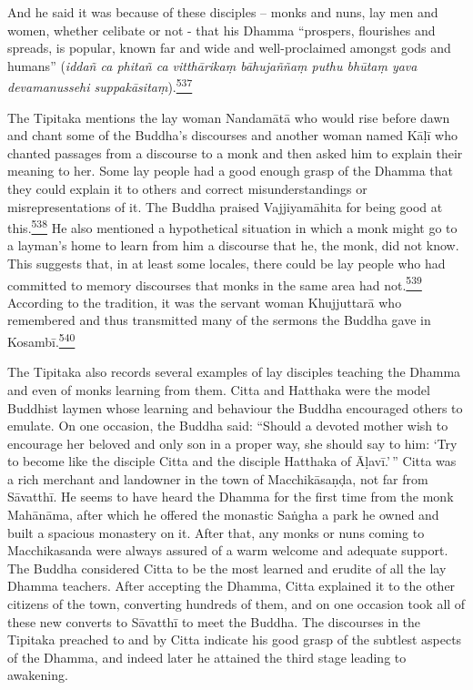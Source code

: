 And he said it was because of these disciples -- monks and nuns, lay men
and women, whether celibate or not - that his Dhamma ``prospers,
flourishes and spreads, is popular, known far and wide and
well-proclaimed amongst gods and humans'' (\emph{iddañ ca phitañ ca
vitthārikaṃ bāhujaññaṃ puthu bhūtaṃ yava devamanussehi
suppakāsitaṃ}).\label{footprints_split_014.html_fnref537}\hyperref[footprints_split_025.htmlux5cux23fn537]{\textsuperscript{537}}

The Tipitaka mentions the lay woman Nandamātā who would rise before dawn
and chant some of the Buddha's discourses and another woman named Kāḷī
who chanted passages from a discourse to a monk and then asked him to
explain their meaning to her. Some lay people had a good enough grasp of
the Dhamma that they could explain it to others and correct
misunderstandings or misrepresentations of it. The Buddha praised
Vajjiyamāhita for being good at
this.\label{footprints_split_014.html_fnref538}\hyperref[footprints_split_025.htmlux5cux23fn538]{\textsuperscript{538}}
He also mentioned a hypothetical situation in which a monk might go to a
layman's home to learn from him a discourse that he, the monk, did not
know. This suggests that, in at least some locales, there could be lay
people who had committed to memory discourses that monks in the same
area had
not.\label{footprints_split_014.html_fnref539}\hyperref[footprints_split_025.htmlux5cux23fn539]{\textsuperscript{539}}
According to the tradition, it was the servant woman Khujjuttarā who
remembered and thus transmitted many of the sermons the Buddha gave in
Kosambī.\label{footprints_split_014.html_fnref540}\hyperref[footprints_split_025.htmlux5cux23fn540]{\textsuperscript{540}}

The Tipitaka also records several examples of lay disciples teaching the
Dhamma and even of monks learning from them. Citta and Hatthaka were the
model Buddhist laymen whose learning and behaviour the Buddha encouraged
others to emulate. On one occasion, the Buddha said: ``Should a devoted
mother wish to encourage her beloved and only son in a proper way, she
should say to him: `Try to become like the disciple Citta and the
disciple Hatthaka of Āḷavī.'\,'' Citta was a rich merchant and landowner
in the town of Macchikāsaṇḍa, not far from Sāvatthī. He seems to have
heard the Dhamma for the first time from the monk Mahānāma, after which
he offered the monastic Saṅgha a park he owned and built a spacious
monastery on it. After that, any monks or nuns coming to Macchikasanda
were always assured of a warm welcome and adequate support. The Buddha
considered Citta to be the most learned and erudite of all the lay
Dhamma teachers. After accepting the Dhamma, Citta explained it to the
other citizens of the town, converting hundreds of them, and on one
occasion took all of these new converts to Sāvatthī to meet the Buddha.
The discourses in the Tipitaka preached to and by Citta indicate his
good grasp of the subtlest aspects of the Dhamma, and indeed later he
attained the third stage leading to awakening.

